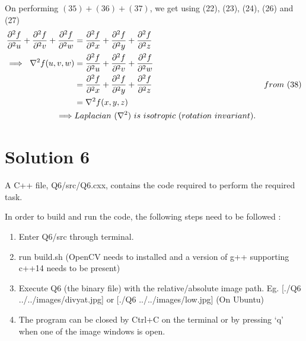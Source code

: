 \documentclass[a4paper,fleqn,11pt]{article}
\theoremstyle{mytheor}
\begin{document}
On performing $(35) + (36) + (37)$, we get using (22), (23), (24), (26) and (27)
\begin{align}
\frac{\partial^2 f}{\partial^2 u} +
\frac{\partial^2 f}{\partial^2 v} +
\frac{\partial^2 f}{\partial^2 w} & =
\frac{\partial^2 f}{\partial^2 x} +
\frac{\partial^2 f}{\partial^2 y} +
\frac{\partial^2 f}{\partial^2 z}\\
\implies\ \nabla^2 f(u, v, w) & = \frac{\partial^2 f}{\partial^2 u} +
							  \frac{\partial^2 f}{\partial^2 v} +
						      \frac{\partial^2 f}{\partial^2 w} \\
						      & = \frac{\partial^2 f}{\partial^2 x} +
							  \frac{\partial^2 f}{\partial^2 y} +
						      \frac{\partial^2 f}{\partial^2 z} & from\ (38) \\
						      & =  \nabla^2 f(x, y, z) \\
\implies & Laplacian\ (\nabla^2)\ is\ isotropic\ (rotation\ invariant). \notag
\end{align}

\section*{Solution 6}
A C++ file, Q6/src/Q6.cxx, contains the code required to perform the required task.

In order to build and run the code, the following steps need to be followed :
\begin{enumerate}
\item Enter Q6/src through terminal.
\item run build.sh (OpenCV needs to installed and a version of g++ supporting c++14 needs to be present)
\item Execute Q6 (the binary file) with the relative/absolute image path. Eg. [./Q6 ../../images/divyat.jpg] or [./Q6 ../../images/low.jpg] (On Ubuntu)
\item The program can be closed by Ctrl+C on the terminal or by pressing `q' when one of the image windows is open.
\end{enumerate}
\pagebreak
\end{document}
